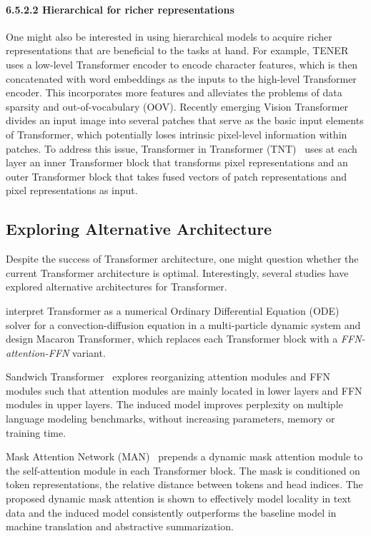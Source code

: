 \documentclass[manuscript,acmsmall,screen,nonacm]{acmart}
\theoremstyle{definition}
\begin{document}
\paragraph{6.5.2.2 Hierarchical for richer representations}
One might also be interested in using hierarchical models to acquire richer representations that are beneficial to the tasks at hand. For example, TENER~\cite{yan2019tener} uses a low-level Transformer encoder to encode character features, which is then concatenated with word embeddings as the inputs to the high-level Transformer encoder. This incorporates more features and alleviates the problems of data sparsity and out-of-vocabulary (OOV). Recently emerging Vision Transformer~\cite{dosovitskiy2020vit} divides an input image into several patches that serve as the basic input elements of Transformer, which potentially loses intrinsic pixel-level information within patches. To address this issue, Transformer in Transformer (TNT)~\cite{han2021tnt} uses at each layer an inner Transformer block that transforms pixel representations and an outer Transformer block that takes fused vectors of patch representations and pixel representations as input.

\subsection{Exploring Alternative Architecture}
Despite the success of Transformer architecture, one might question whether the current Transformer architecture is optimal. Interestingly, several studies have explored alternative architectures for Transformer.

\citet{lu19macaron} interpret Transformer as a numerical Ordinary Differential Equation (ODE) solver for a convection-diffusion equation in a multi-particle dynamic system and design Macaron Transformer, which replaces each Transformer block with a \textit{FFN-attention-FFN} variant.

Sandwich Transformer~\cite{ofir20sandwichxformer} explores reorganizing attention modules and FFN modules such that attention modules are mainly located in lower layers and FFN modules in upper layers. The induced model improves perplexity on multiple language modeling benchmarks, without increasing parameters, memory or training time.

Mask Attention Network (MAN)~\cite{fan-etal-2021-mask} prepends a dynamic mask attention module to the self-attention module in each Transformer block. The mask is conditioned on token representations, the relative distance between tokens and head indices. The proposed dynamic mask attention is shown to effectively model locality in text data and the induced model consistently outperforms the baseline model in machine translation and abstractive summarization.
\end{document}

